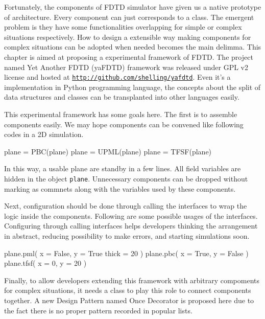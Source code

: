 Fortunately, the components of FDTD simulator have given us a native prototype of architecture. Every component can just
corresponds to a class. The emergent problem is they have some functionalities overlapping for simple or complex
situations respectively. How to design a extensible way making components for complex situations can be adopted when
needed becomes the main delimma. This chapter is aimed at proposing a experimental framework of FDTD. The project
named Yet Another FDTD (yaFDTD) framework was released under GPL v2 license and hosted at
\texttt{\url{http://github.com/shelling/yafdtd}}. Even it's a implementation in Python programming language, the
concepts about the split of data structures and classes can be transplanted into other languages easily.

This experimental framework has some goals here. The first is to assemble components easily. We may hope components can
be convened like following codes in a 2D simulation.
\begin{code}
  plane = PBC(plane)
  plane = UPML(plane)
  plane = TFSF(plane)
\end{code}
In this way, a usable plane are standby in a few lines. All field variables are hidden in the object
\texttt{plane}. Unnecessary components can be dropped without marking as commnets along with the variables used by these
components.

Next, configuration should be done through calling the interfaces to wrap the logic inside the components. Following are
some possible usages of the interfaces. Configuring through calling interfaces helps developers thinking the arrangement
in abstract, reducing possibility to make errors, and starting simulations soon.
\begin{code}
  plane.pml(
    x = False,
    y = True
    thick = 20
  )
  plane.pbc(
    x = True,
    y = False
  )
  plane.tfsf(
    x = 0,
    y = 20
  )
\end{code}
Finally, to allow developers extending this framework with arbitrary compoments for complex situations, it needs a class
to play this role to connect components together. A new Design Pattern named Once Decorator is proposed here due to the
fact there is no proper pattern recorded in popular lists.
